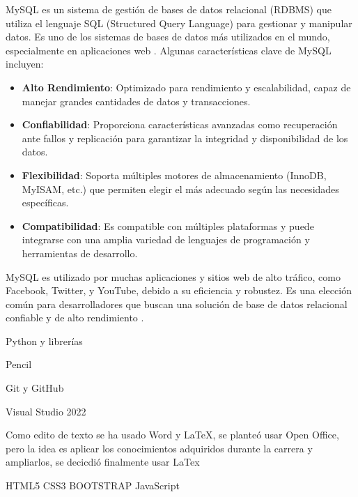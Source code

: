 MySQL es un sistema de gestión de bases de datos relacional (RDBMS) que utiliza el lenguaje SQL (Structured Query Language) para gestionar y manipular datos. Es uno de los sistemas de bases de datos más utilizados en el mundo, especialmente en aplicaciones web \cite{mysql}. Algunas características clave de MySQL incluyen:

\begin{itemize}
    \item \textbf{Alto Rendimiento}: Optimizado para rendimiento y escalabilidad, capaz de manejar grandes cantidades de datos y transacciones.
    \item \textbf{Confiabilidad}: Proporciona características avanzadas como recuperación ante fallos y replicación para garantizar la integridad y disponibilidad de los datos.
    \item \textbf{Flexibilidad}: Soporta múltiples motores de almacenamiento (InnoDB, MyISAM, etc.) que permiten elegir el más adecuado según las necesidades específicas.
    \item \textbf{Compatibilidad}: Es compatible con múltiples plataformas y puede integrarse con una amplia variedad de lenguajes de programación y herramientas de desarrollo.
\end{itemize}

MySQL es utilizado por muchas aplicaciones y sitios web de alto tráfico, como Facebook, Twitter, y YouTube, debido a su eficiencia y robustez. Es una elección común para desarrolladores que buscan una solución de base de datos relacional confiable y de alto rendimiento \cite{mysqlcookbook}.


Python y librerías

Pencil

Git y GitHub

Visual Studio 2022

Como edito de texto se ha usado Word y LaTeX, se planteó usar Open Office, pero la idea es aplicar los conocimientos adquiridos durante la carrera y ampliarlos, se decicdió finalmente usar LaTex

HTML5 
CSS3 
BOOTSTRAP 
JavaScript 

